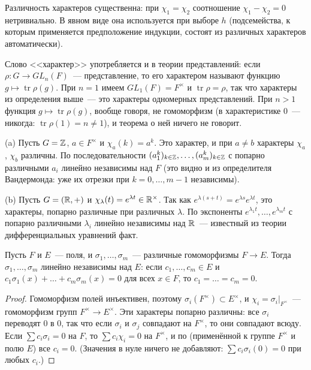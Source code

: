 Различность характеров существенна: при $\chi_1=\chi_2$ соотношение $\chi_1-\chi_2=0$ нетривиально. В явном виде она
используется при выборе $h$ (подсемейства, к которым применяется предположение индукции, состоят из различных
характеров автоматически).

\begin{remark}[5.14a]
Слово <<характер>> употребляется и в теории представлений: если $\rho\colon G\to GL_n(F)$~--- представление, то его
характером называют функцию $g\mapsto\operatorname{tr}\rho(g)$. При $n=1$ имеем $GL_1(F)=F^\times$ и
$\operatorname{tr}\rho=\rho$, так что характеры из определения выше~--- это характеры одномерных представлений. При $n>1$
функция $g\mapsto\operatorname{tr}\rho(g)$, вообще говоря, не гомоморфизм (в характеристике $0$~--- никогда:
$\operatorname{tr}\rho(1)=n\ne1$), и теорема  о ней ничего не говорит.
\end{remark}

\begin{example}[5.14b]
(a) Пусть $G=\mathbb Z$, $a\in F^\times$ и $\chi_a(k)=a^k$. Это характер, и при $a\ne b$ характеры $\chi_a$, $\chi_b$
различны. По  последовательности $(a_1^k)_{k\in\mathbb Z},\dots,(a_m^k)_{k\in\mathbb Z}$ с попарно различными $a_i$
линейно независимы над $F$ (это видно и из определителя Вандермонда: уже их отрезки при $k=0,\dots,m-1$ независимы).

(b) Пусть $G=(\mathbb R,+)$ и $\chi_\lambda(t)=e^{\lambda t}\in\mathbb R^\times$. Так как $e^{\lambda(s+t)}=e^{\lambda s}e^{\lambda t}$,
это характеры, попарно различные при различных $\lambda$. По  экспоненты $e^{\lambda_1t},\dots,e^{\lambda_mt}$
с попарно различными $\lambda_i$ линейно независимы над $\mathbb R$~--- известный из теории дифференциальных уравнений факт.
\end{example}

\begin{corollary}[5.15]
Пусть $F$ и $E$~--- поля, и $\sigma_1,\dots,\sigma_m$~--- различные гомоморфизмы $F\to E$. Тогда
$\sigma_1,\dots,\sigma_m$ линейно независимы над $E$: если $c_1,\dots,c_m\in E$ и
$c_1\sigma_1(x)+\dots+c_m\sigma_m(x)=0$ для всех $x\in F$, то $c_1=\dots=c_m=0$.
\end{corollary}

\begin{proof}
Гомоморфизм полей инъективен, поэтому $\sigma_i(F^\times)\subset E^\times$, и $\chi_i=\sigma_i|_{F^\times}$~---
гомоморфизм групп $F^\times\to E^\times$. Эти характеры попарно различны: все $\sigma_i$ переводят $0$ в $0$, так что
если $\sigma_i$ и $\sigma_j$ совпадают на $F^\times$, то они совпадают всюду. Если $\sum c_i\sigma_i=0$ на $F$, то
$\sum c_i\chi_i=0$ на $F^\times$, и по  (применённой к группе $F^\times$ и полю $E$) все $c_i=0$. (Значения в
нуле ничего не добавляют: $\sum c_i\sigma_i(0)=0$ при любых $c_i$.)
\end{proof}

